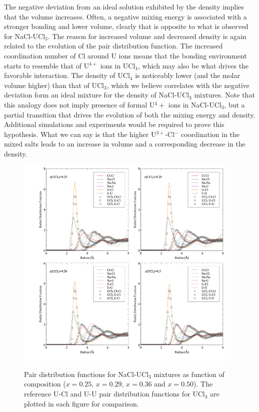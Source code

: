 \documentclass[preprint,3p,10pt,onecolumn,number,sort&compress]{elsarticle}
\begin{document}
The negative deviation from an ideal solution exhibited by the density implies that the volume increases. Often, a negative mixing energy is associated with a stronger bonding and lower volume, clearly that is opposite to what is observed for NaCl-UCl$_3$. The reason for increased volume and decreased density is again related to the evolution of the pair distribution function. The increased coordination number of Cl around U ions means that the bonding environment starts to resemble that of U$^{4+}$ ions in UCl$_4$, which may also be what drives the favorable interaction. The density of UCl$_4$ is noticeably lower (and the molar volume higher) than that of UCl$_3$, which we believe correlates with the negative deviation form an ideal mixture for the density of NaCl-UCl$_3$ mixtures. Note that this analogy does not imply  presence of formal U$^4+$ ions in NaCl-UCl$_3$, but a partial transition that drives the evolution of both the mixing energy and density. Additional simulations and experiments would be required to prove this hypothesis. What we can say is that the higher U$^{3+}$-Cl$^{-}$ coordination in the mixed salts leads to an increase in volume and a corresponding decrease in the density.

 \begin{figure}[htb]
\centering
\includegraphics[width=0.95\textwidth]{fig14.jpg}
\caption{Pair distribution functions for NaCl-UCl$_3$ mixtures as function of composition ($x=0.25$, $x=0.29$, $x=0.36$ and $x=0.50$). The reference U-Cl and U-U pair distribution functions for UCl$_3$ are plotted in each figure for comparison.} 
\label{fig:fig_pair}
\end{figure}
\end{document}
